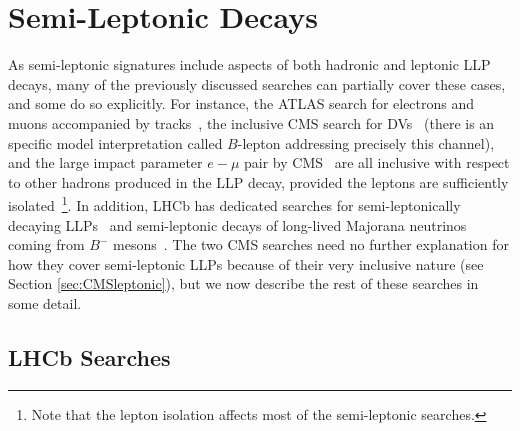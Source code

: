 \section{Semi-Leptonic Decays}
\label{subsec:dsemilep}

As semi-leptonic signatures include aspects of both hadronic and leptonic LLP decays, many of the previously discussed searches can partially cover these cases, and some do so explicitly. For instance, the ATLAS search for electrons and muons accompanied by tracks~\cite{Aad:2015rba}, the inclusive CMS search for DVs~\cite{CMS:2017oor} (there is an specific model interpretation called $B$-lepton addressing precisely this channel), and the large impact parameter $e-\mu$ pair by CMS~\cite{CMS-PAS-EXO-16-022} are all inclusive with respect to other hadrons produced in the LLP decay, provided the leptons are sufficiently isolated~\footnote{Note that the lepton isolation affects most of the semi-leptonic searches.}. In addition, LHCb has dedicated searches for semi-leptonically decaying  LLPs~\cite{Aaij:2016xmb} and semi-leptonic decays of long-lived Majorana neutrinos coming from $B^{-}$ mesons~\cite{Aaij:2014aba}.   The two CMS searches \cite{CMS:2017oor,CMS-PAS-EXO-16-022} need no further explanation for how they cover semi-leptonic LLPs because of their very inclusive nature (see Section \ref{sec:CMSleptonic}), but we now describe the rest of these searches in some detail.    

\subsection{LHCb Searches}

